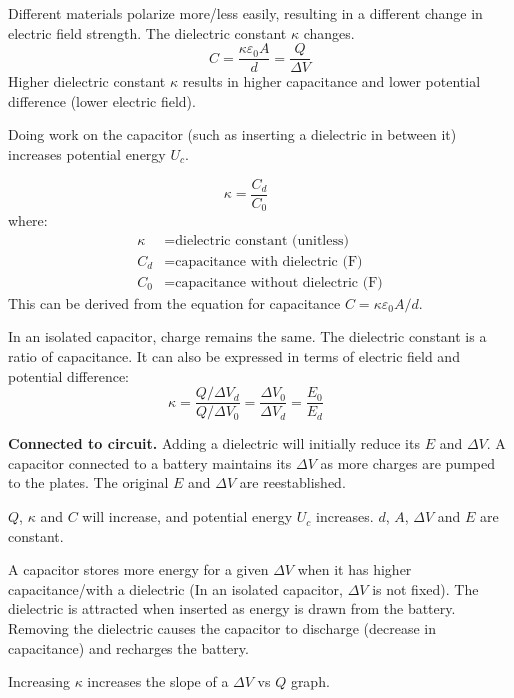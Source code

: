 \documentclass{article}
\newcommand{\theorem}[2]{\begin{tcolorbox}[title={#1},colback=blue!5!white,colframe=blue!75!black,parbox=false] #2 \end{tcolorbox}}
\begin{document}
Different materials polarize more/less easily, resulting in a different change in electric field strength. The dielectric constant $\kappa$ changes.
\begin{equation*}
    C=\frac{\kappa \varepsilon_0 A}{d}=\frac{Q}{\Delta V}
\end{equation*}
Higher dielectric constant $\kappa$ results in higher capacitance and lower potential difference (lower electric field).

Doing work on the capacitor (such as inserting a dielectric in between it) increases potential energy $U_c$.

\theorem{Dielectric}{
	\begin{equation*}
	    \kappa=\frac{C_d}{C_0} \qquad
	\end{equation*}
	where:
	\begin{align*}
		\kappa&=\text{dielectric constant (unitless)} \\
		C_d&=\text{capacitance with dielectric (F)} \\
		C_0&=\text{capacitance without dielectric (F)}
	\end{align*}
	This can be derived from the equation for capacitance $C=\kappa\varepsilon_0A/d$.
}

In an isolated capacitor, charge remains the same. The dielectric constant is a ratio of capacitance. It can also be expressed in terms of electric field and potential difference:
\begin{equation*}
	\kappa
	=\frac{Q/\Delta V_d}{Q/\Delta V_0}
	=\frac{\Delta V_0}{\Delta V_d}=\frac{E_0}{E_d} \qquad
\end{equation*}

\textbf{Connected to circuit.} Adding a dielectric will initially reduce its $E$ and $\Delta V$. A capacitor connected to a battery maintains its $\Delta V$ as more charges are pumped to the plates. The original $E$ and $\Delta V$ are reestablished.

$Q$, $\kappa$ and $C$ will increase, and potential energy $U_c$ increases. $d$, $A$, $\Delta V$ and $E$ are constant.

A capacitor stores more energy for a given $\Delta V$ when it has higher capacitance/with a dielectric (In an isolated capacitor, $\Delta V$ is not fixed). The dielectric is attracted when inserted as energy is drawn from the battery. Removing the dielectric causes the capacitor to discharge (decrease in capacitance) and recharges the battery.

Increasing $\kappa$ increases the slope of a $\Delta V$ vs $Q$ graph.
\end{document}
